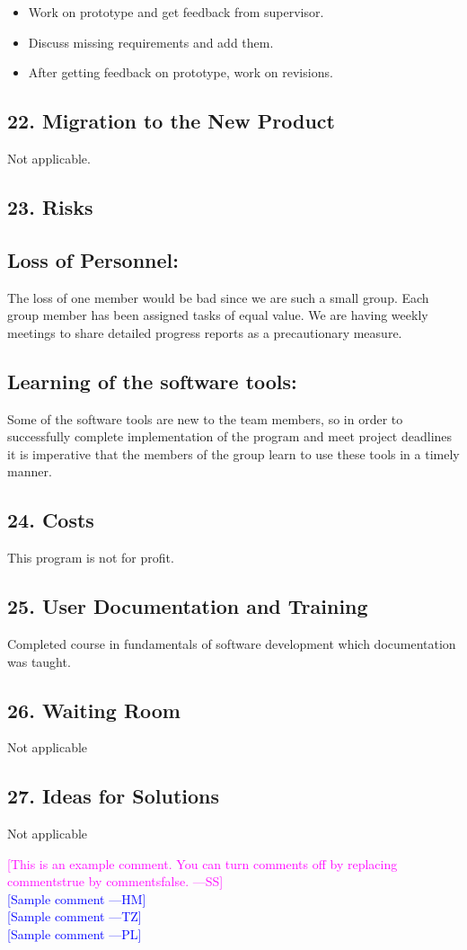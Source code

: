\documentclass[12pt]{article}
\newcommand{\authornote}[3]{\textcolor{#1}{[#3 ---#2]}}
\newcommand{\authornote}[3]{}
\newcommand{\wss}[1]{\authornote{magenta}{SS}{#1}}
\newcommand{\hm}[1]{\authornote{blue}{HM}{#1}} %
\newcommand{\tz}[1]{\authornote{blue}{TZ}{#1}} %
\newcommand{\pl}[1]{\authornote{blue}{PL}{#1}} %
\begin{document}
\begin{itemize}
  \item Work on prototype and get feedback from supervisor.
  \item Discuss missing requirements and add them.
  \item After getting feedback on prototype, work on revisions.
\end{itemize}

\subsection{22. Migration to the New Product }
Not applicable.

\subsection{23. Risks }

\subsection{Loss of Personnel: }The loss of one member would be bad since we are such a small group. Each group member has been assigned tasks of equal value. We are having weekly meetings to share detailed progress reports as a precautionary measure. 

\subsection{Learning of the software tools:} Some of the software tools are new to the team members, so in order to successfully complete implementation of the program and meet project deadlines it is imperative that the members of the group learn to use these tools in a timely manner.

\subsection{24. Costs }
This program is not for profit.

\subsection{25. User Documentation and Training }
Completed course in fundamentals of software development which documentation was taught.

\subsection{26. Waiting Room}
Not applicable 

\subsection{27. Ideas for Solutions}
Not applicable



\noindent \wss{This is an example comment.  You can turn comments off by replacing
  commentstrue by commentsfalse.}\\
\hm{Sample comment}\\
\tz{Sample comment}\\
\pl{Sample comment}
\end{document}
